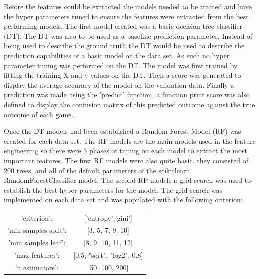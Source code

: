 \documentclass{imc-inf}
\begin{document}
	Before the features could be extracted the models needed to be trained and have the hyper parameters tuned to ensure the features were extracted from the best performing models. The first model created was a basic decision tree classifier (DT). The DT was also to be used as a baseline prediction parameter. Instead of being used to describe the ground truth the DT would be used to describe the prediction capabilities of a basic model on the data set. As such no hyper parameter tuning was performed on the DT. The model was first trained by fitting the training X and y values on the DT. Then a score was generated to display the average accuracy of the model on the validation data. Finally a prediction was made using the 'predict' function, a function print score was also defined to display the confusion matrix of this predicted outcome against the true  outcome of each game. 
	\newline
	
	Once the DT models had been established a Random Forest Model (RF) was created for each data set. The RF models are the main models used in the feature engineering so there were 3 phases of tuning on each model to extract the most important features.
	The first RF models were also quite basic, they consisted of 200 trees, and all of the default parameters of the scikitlearn RandomForestClassifier model. 
	The second RF models a grid search was used to establish the best hyper parameters for the model. The grid search was implemented on each data set and was populated with the following criterion: 
	\begin{center}
	\begin{tabular}{c c}
		'criterion': &['entropy','gini'] \\
		'min samples split': & [3, 5, 7, 9, 10] \\
		'min samples leaf': & [8, 9, 10, 11, 12] \\
		'max features': & [0.5, "sqrt", "log2", 0.8] \\
 		'n estimators': & [50, 100, 200]
	\end{tabular}
	\end{center}
	
\end{document}
